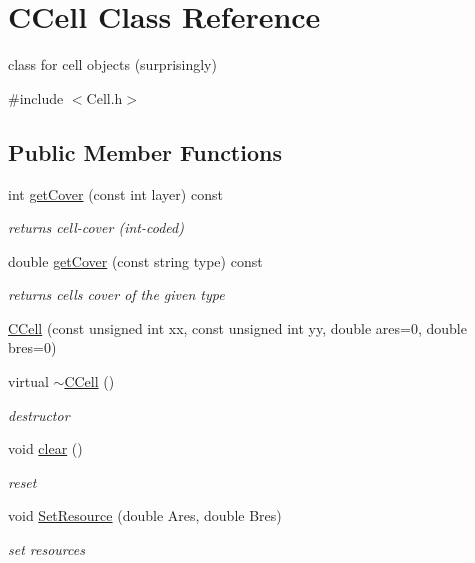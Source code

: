 \hypertarget{class_c_cell}{}\section{C\+Cell Class Reference}
\label{class_c_cell}


class for cell objects (surprisingly)  




{\ttfamily \#include $<$Cell.\+h$>$}

\subsection*{Public Member Functions}
\begin{DoxyCompactItemize}
\item 
int \mbox{\hyperlink{class_c_cell_a0b6846606bd1c95525d050ac697e1ae2}{get\+Cover}} (const int layer) const
\begin{DoxyCompactList}\small\item\em returns cell-\/cover (int-\/coded) \end{DoxyCompactList}\item 
double \mbox{\hyperlink{class_c_cell_ae47dee0b8740b16d54d5dd5f7e56a910}{get\+Cover}} (const string type) const
\begin{DoxyCompactList}\small\item\em returns cell\textquotesingle{}s cover of the given type \end{DoxyCompactList}\item 
\mbox{\hyperlink{class_c_cell_a1de6b6c2ee4ef46f458833aba37a8018}{C\+Cell}} (const unsigned int xx, const unsigned int yy, double ares=0, double bres=0)
\item 
virtual \mbox{\hyperlink{class_c_cell_a297edd2839a64d14a8ffffb915bbf18c}{$\sim$\+C\+Cell}} ()
\begin{DoxyCompactList}\small\item\em destructor \end{DoxyCompactList}\item 
void \mbox{\hyperlink{class_c_cell_a8983be7ad0586cbf9b0327761fb5b0f0}{clear}} ()
\begin{DoxyCompactList}\small\item\em reset \end{DoxyCompactList}\item 
void \mbox{\hyperlink{class_c_cell_a3a37e68bb48fe43cc14f8417ea93327b}{Set\+Resource}} (double Ares, double Bres)
\begin{DoxyCompactList}\small\item\em set resources \end{DoxyCompactList}\item 

\end{DoxyCompactItemize}
